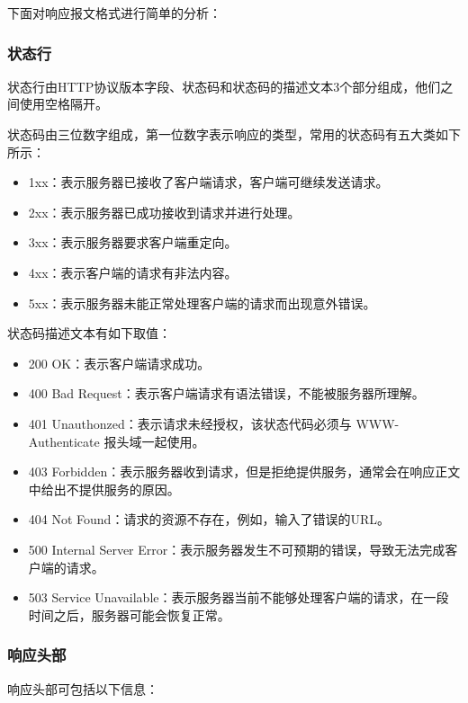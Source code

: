 \documentclass[bachelor]{thesis-uestc}
\begin{document}
下面对响应报文格式进行简单的分析：
\subsubsection*{状态行}
状态行由HTTP协议版本字段、状态码和状态码的描述文本3个部分组成，他们之间使用空格隔开。

状态码由三位数字组成，第一位数字表示响应的类型，常用的状态码有五大类如下所示：
\begin{itemize}
	\item 1xx：表示服务器已接收了客户端请求，客户端可继续发送请求。
	\item 2xx：表示服务器已成功接收到请求并进行处理。
	\item 3xx：表示服务器要求客户端重定向。
	\item 4xx：表示客户端的请求有非法内容。
	\item 5xx：表示服务器未能正常处理客户端的请求而出现意外错误。
\end{itemize}

状态码描述文本有如下取值：

\begin{itemize}
	\item 200 OK：表示客户端请求成功。
	\item 400 Bad Request：表示客户端请求有语法错误，不能被服务器所理解。
	\item 401 Unauthonzed：表示请求未经授权，该状态代码必须与 WWW-Authenticate 报头域一起使用。
	\item 403 Forbidden：表示服务器收到请求，但是拒绝提供服务，通常会在响应正文中给出不提供服务的原因。
	\item 404 Not Found：请求的资源不存在，例如，输入了错误的URL。
	\item 500 Internal Server Error：表示服务器发生不可预期的错误，导致无法完成客户端的请求。
	\item 503 Service Unavailable：表示服务器当前不能够处理客户端的请求，在一段时间之后，服务器可能会恢复正常。
\end{itemize}

\subsubsection*{响应头部}

响应头部可包括以下信息：
\end{document}
